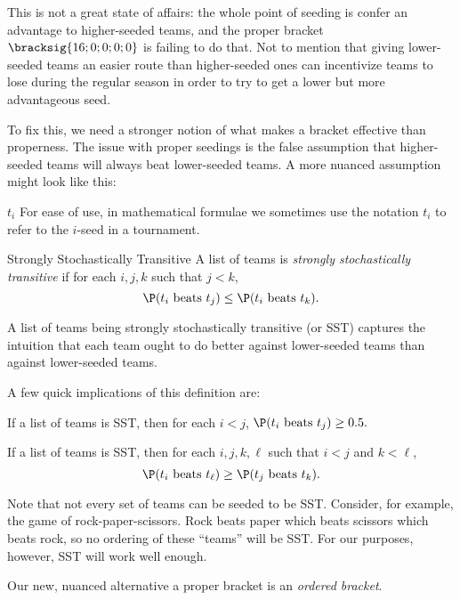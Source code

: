 {This is not a great state of affairs: the whole point of seeding is confer an advantage to higher-seeded teams, and the proper bracket $\bracksig{16; 0; 0; 0; 0}$ is failing to do that. Not to mention that giving lower-seeded teams an easier route than higher-seeded ones can incentivize teams to lose during the regular season in order to try to get a lower but more advantageous seed.

To fix this, we need a stronger notion of what makes a bracket effective than properness. The issue with proper seedings is the false assumption that higher-seeded teams will always beat lower-seeded teams. A more nuanced assumption might look like this:

\begin{definition}{$t_i$}{}
    For ease of use, in mathematical formulae we sometimes use the notation $t_i$ to refer to the $i$-seed in a tournament.
\end{definition}

\begin{definition}{Strongly Stochastically Transitive}{}
    A list of teams is \textit{strongly stochastically transitive} if for each $i, j, k$ such that $j < k$, $$\P(t_i \textrm{ beats } t_j) \leq \P(t_i \textrm{ beats } t_k).$$
\end{definition}

A list of teams being strongly stochastically transitive (or SST) captures the intuition that each team ought to do better against lower-seeded teams than against lower-seeded teams.

A few quick implications of this definition are:

\begin{corollary}{}{}
    If a list of teams is SST, then for each $i < j$, $\P(t_i \textrm{ beats } t_j) \geq 0.5.$
\end{corollary}

\begin{corollary}{}{}
    If a list of teams is SST, then for each $i, j, k, \ell$ such that $i < j$ and $k < \ell$, $$\P(t_i \textrm{ beats } t_\ell) \geq \P(t_j \textrm{ beats } t_k).$$
\end{corollary}

Note that not every set of teams can be seeded to be SST. Consider, for example, the game of rock-paper-scissors. Rock beats paper which beats scissors which beats rock, so no ordering of these ``teams'' will be SST. For our purposes, however, SST will work well enough.

Our new, nuanced alternative a proper bracket is an \textit{ordered bracket}.

}

